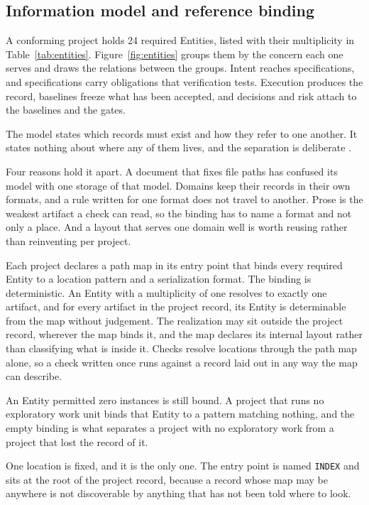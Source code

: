 \subsection{Information model and reference binding}

A conforming project holds 24 required Entities, listed with their multiplicity in Table~\ref{tab:entities}. Figure~\ref{fig:entities} groups them by the concern each one serves and draws the relations between the groups. Intent reaches specifications, and specifications carry obligations that verification tests. Execution produces the record, baselines freeze what has been accepted, and decisions and risk attach to the baselines and the gates.

The model states which records must exist and how they refer to one another. It states nothing about where any of them lives, and the separation is deliberate \citep[Section~\hyperlink{nss-1.8}{1.8}]{pss2026}.

Four reasons hold it apart. A document that fixes file paths has confused its model with one storage of that model. Domains keep their records in their own formats, and a rule written for one format does not travel to another. Prose is the weakest artifact a check can read, so the binding has to name a format and not only a place. And a layout that serves one domain well is worth reusing rather than reinventing per project.

Each project declares a path map in its entry point that binds every required Entity to a location pattern and a serialization format. The binding is deterministic. An Entity with a multiplicity of one resolves to exactly one artifact, and for every artifact in the project record, its Entity is determinable from the map without judgement. The realization may sit outside the project record, wherever the map binds it, and the map declares its internal layout rather than classifying what is inside it. Checks resolve locations through the path map alone, so a check written once runs against a record laid out in any way the map can describe.

An Entity permitted zero instances is still bound. A project that runs no exploratory work unit binds that Entity to a pattern matching nothing, and the empty binding is what separates a project with no exploratory work from a project that lost the record of it.

One location is fixed, and it is the only one. The entry point is named \texttt{INDEX} and sits at the root of the project record, because a record whose map may be anywhere is not discoverable by anything that has not been told where to look.


